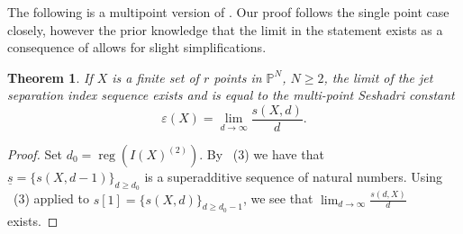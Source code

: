 \documentclass[12pt, reqno]{amsart}
\numberwithin{equation}{section}
\def\e{\ensuremath{\varepsilon}}
\renewcommand{\P}{{\mathbb P}}
\DeclareMathOperator{\reg}{reg}
\theoremstyle{plain} %
\newtheorem{thm}{Theorem}[section]
\theoremstyle{definition}
\theoremstyle{remark}
\begin{document}
The following is a multipoint version of \cite[Theorem 5.1.17]{Laz04}. Our proof follows the single point case closely, however the prior knowledge that the limit in the statement exists as a consequence of  allows for slight simplifications. %

\begin{thm}
\label{prop:e}
If $X$ is a finite set of $r$ points in $\P^N$, $N\geq 2$, the limit of the jet separation index sequence exists and is equal to the multi-point Seshadri constant
\[
\e(X)= \lim_{d \to \infty} \frac{s(X,d)}{d}.
\]
\end{thm}
\begin{proof}

Set $d_0=\reg(I(X)^{(2)})$. By ~(3) we have that $\underline{s}=\{s(X,d-1)\}_{d\geq d_0}$ is a superadditive sequence of natural numbers. Using  ~(3) applied to $s[1]=\{s(X,d)\}_{d\geq d_0-1}$, we see that $\lim_{d\to \infty} \frac{s(d,X)}{d}$ exists. 


\end{proof}
\end{document}
